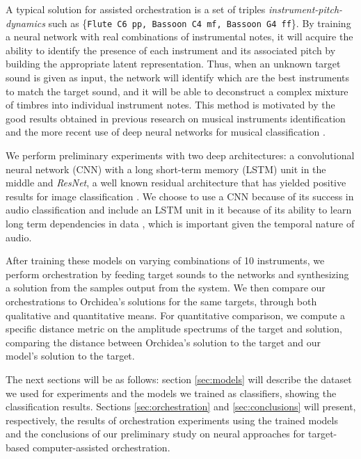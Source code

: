 \documentclass[runningheads,a4paper]{llncs}
\begin{document}
A typical solution for assisted orchestration is a set of triples \emph{instrument-pitch-dynamics} such as \{\texttt{Flute C6 pp, Bassoon C4 mf, Bassoon G4 ff}\}. By training a neural network with real combinations of instrumental notes, it will acquire the ability to identify the presence of each instrument and its associated pitch by building the appropriate latent representation. Thus, when an unknown target sound is given as input, the network will identify which are the best instruments to match the target sound, and it will be able to  deconstruct a complex mixture of timbres into individual instrument notes. This method is motivated by the good results obtained in previous research on musical instruments identification \cite{Benetos07, Kitahara05} and the more recent use of deep neural networks for musical classification \cite{lostanlen16, Bian19}.

We perform preliminary experiments with two deep architectures: a convolutional neural network (CNN) with a long short-term memory (LSTM) unit in the middle and \emph{ResNet}, a well known residual architecture that has yielded positive results for image classification \cite{He15}. We choose to use a CNN because of its success in audio classification \cite{Hershey17} and include an LSTM unit in it because of its ability to learn long term dependencies in data \cite{Hochreiter97}, which is important given the temporal nature of audio.

After training these models on varying combinations of 10 instruments, we perform orchestration by feeding target sounds to the networks and synthesizing a solution from the samples output from the system. We then compare our orchestrations to Orchidea's solutions for the same targets, through both qualitative and quantitative means. For quantitative comparison, we compute a specific distance metric on the amplitude spectrums of the target and solution, comparing the distance between Orchidea's solution to the target and our model's solution to the target.

The next sections will be as follows: section \ref{sec:models} will describe the dataset we used for experiments and the models we trained as classifiers, showing the classification results. Sections \ref{sec:orchestration} and \ref{sec:conclusions} will present, respectively, the results of orchestration experiments using the trained models and the conclusions of our preliminary study on neural approaches for target-based computer-assisted orchestration.

\end{document}

